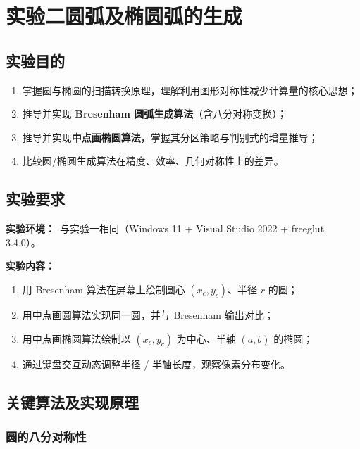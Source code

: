 \documentclass[a4paper,12pt]{ctexart}
\begin{document}
\clearpage
\section{实验二\quad 圆弧及椭圆弧的生成}

\subsection{实验目的}

\begin{enumerate}[leftmargin=2em,itemsep=0.2em]
    \item 掌握圆与椭圆的扫描转换原理，理解利用图形对称性减少计算量的核心思想；
    \item 推导并实现 \textbf{Bresenham 圆弧生成算法}（含八分对称变换）；
    \item 推导并实现\textbf{中点画椭圆算法}，掌握其分区策略与判别式的增量推导；
    \item 比较圆/椭圆生成算法在精度、效率、几何对称性上的差异。
\end{enumerate}

\subsection{实验要求}

\textbf{实验环境：}\ 与实验一相同（Windows 11 + Visual Studio 2022 + freeglut 3.4.0）。

\textbf{实验内容：}
\begin{enumerate}[leftmargin=2em,itemsep=0.2em]
    \item 用 Bresenham 算法在屏幕上绘制圆心 $(x_c,y_c)$、半径 $r$ 的圆；
    \item 用中点画圆算法实现同一圆，并与 Bresenham 输出对比；
    \item 用中点画椭圆算法绘制以 $(x_c,y_c)$ 为中心、半轴 $(a,b)$ 的椭圆；
    \item 通过键盘交互动态调整半径 / 半轴长度，观察像素分布变化。
\end{enumerate}

\subsection{关键算法及实现原理}

\subsubsection{圆的八分对称性}
\end{document}
